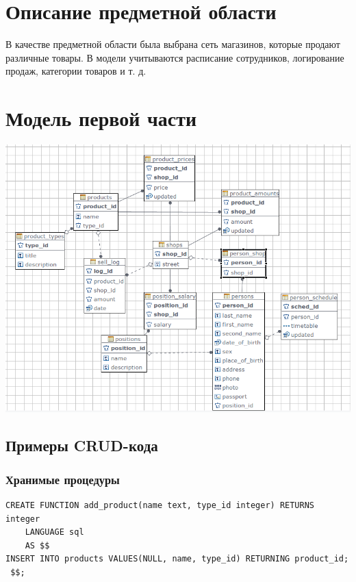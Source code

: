 

\usepackage{graphicx}
\usepackage{adjustbox}
\usepackage{multirow}

\def \labtype {Курсовая}
\def \labsubj {Системы баз данных}
\def \labauthor {Айтуганов Д. А. \\ Чебыкин И. Б.}
\def \labgroup {P3301}
\def \labinsp {Беликов П. А.}
\def \labname{Разработка базы данных сети магазинов}
\isonefalse
\isnametrue
\isnumfalse


\lstset{
	caption=,
	basicstyle=\ttfamily\selectfont\scriptsize
}


\tableofcontents
\newpage
\section{Описание предметной области}
В качестве предметной области была выбрана сеть магазинов, которые продают
различные товары. В модели учитываются расписание сотрудников, логирование
продаж, категории товаров и т. д.
\section{Модель первой части}
\includegraphics[width=\textwidth]{img/diagram.png}
\subsection{Примеры CRUD-кода}
\subsubsection{Хранимые процедуры}
\begin{verbatim}
CREATE FUNCTION add_product(name text, type_id integer) RETURNS integer
    LANGUAGE sql
    AS $$
INSERT INTO products VALUES(NULL, name, type_id) RETURNING product_id;
 $$;
\end{verbatim}

